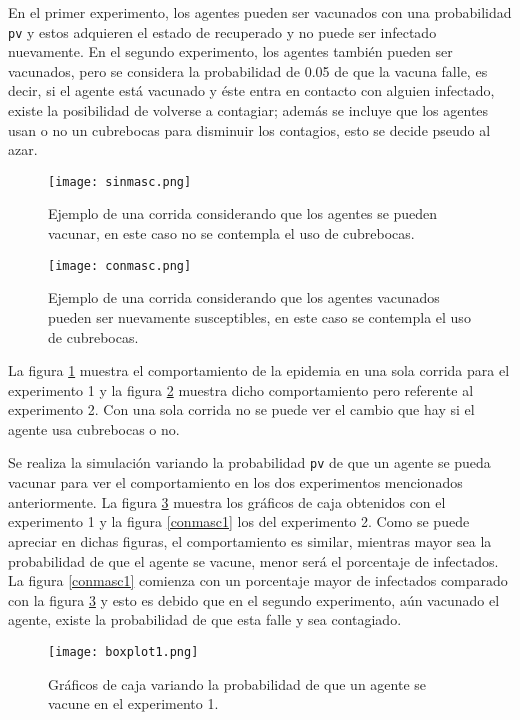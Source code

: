 \documentclass[final,6p,times,twocolumn]{elsarticle}
\begin{document}
En el primer experimento, los agentes pueden ser vacunados con una probabilidad \texttt{pv} y estos adquieren el estado de recuperado y no puede ser infectado nuevamente. En el segundo experimento, los agentes también pueden ser vacunados, pero se considera la probabilidad de 0.05 de que la vacuna falle, es decir, si el agente está vacunado y éste entra en contacto con alguien infectado, existe la posibilidad de volverse a contagiar; además se incluye que los agentes usan o no un cubrebocas para disminuir los contagios, esto se decide pseudo al azar. 
\begin{figure}
\label{sinmasc}
\centering
\texttt{[image: sinmasc.png]}
\caption{Ejemplo de una corrida considerando que los agentes se pueden vacunar, en este caso no se contempla el uso de cubrebocas.}
\end{figure}
\begin{figure}
\label{conmasc}
\centering
\texttt{[image: conmasc.png]}
\caption{Ejemplo de una corrida considerando que los agentes vacunados pueden ser nuevamente susceptibles, en este caso se contempla el uso de cubrebocas.}
\end{figure}
La figura \ref{sinmasc} muestra el comportamiento de la epidemia en una sola corrida para el experimento 1 y la figura \ref{conmasc} muestra dicho comportamiento pero referente al experimento 2. Con una sola corrida no se puede ver el cambio que hay si el agente usa cubrebocas o no. 


Se realiza la simulación variando la probabilidad \texttt{pv} de que un agente se pueda vacunar para ver el comportamiento en los dos experimentos mencionados anteriormente. La figura \ref{sinmasc1} muestra los gráficos de caja obtenidos con el experimento 1 y la figura \ref{conmasc1} los del experimento 2. Como se puede apreciar en dichas figuras, el comportamiento es similar, mientras mayor sea la probabilidad de que el agente se vacune, menor será el porcentaje de infectados. La figura \ref{conmasc1} comienza con un porcentaje mayor de infectados comparado con la figura \ref{sinmasc1} y esto es debido que en el segundo experimento, aún vacunado el agente, existe la probabilidad de que esta falle y sea contagiado. 

\begin{figure}
\label{sinmasc1}
\centering
\texttt{[image: boxplot1.png]}
\caption{Gráficos de caja variando la probabilidad de que un agente se vacune en el experimento 1.}
\end{figure}
\end{document}
